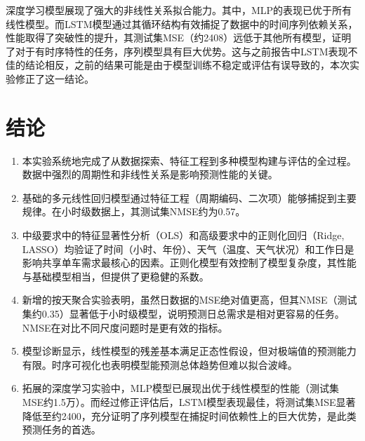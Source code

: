 \documentclass[UTF8,a4paper,10pt]{ctexart}
\begin{document}
深度学习模型展现了强大的非线性关系拟合能力。其中，MLP的表现已优于所有线性模型。而LSTM模型通过其循环结构有效捕捉了数据中的时间序列依赖关系，性能取得了突破性的提升，其测试集MSE（约2408）远低于其他所有模型，证明了对于有时序特性的任务，序列模型具有巨大优势。这与之前报告中LSTM表现不佳的结论相反，之前的结果可能是由于模型训练不稳定或评估有误导致的，本次实验修正了这一结论。

\section{结论}
\begin{enumerate}[label=\arabic{enumi}.]
    \item 本实验系统地完成了从数据探索、特征工程到多种模型构建与评估的全过程。数据中强烈的周期性和非线性关系是影响预测性能的关键。
    \item 基础的多元线性回归模型通过特征工程（周期编码、二次项）能够捕捉到主要规律。在小时级数据上，其测试集NMSE约为0.57。
    \item 中级要求中的特征显著性分析（OLS）和高级要求中的正则化回归（Ridge, LASSO）均验证了时间（小时、年份）、天气（温度、天气状况）和工作日是影响共享单车需求最核心的因素。正则化模型有效控制了模型复杂度，其性能与基础模型相当，但提供了更稳健的系数。
    \item 新增的按天聚合实验表明，虽然日数据的MSE绝对值更高，但其NMSE（测试集约0.35）显著低于小时级模型，说明预测日总需求是相对更容易的任务。NMSE在对比不同尺度问题时是更有效的指标。
    \item 模型诊断显示，线性模型的残差基本满足正态性假设，但对极端值的预测能力有限。时序可视化也表明模型能预测总体趋势但难以拟合波峰。
    \item 拓展的深度学习实验中，MLP模型已展现出优于线性模型的性能（测试集MSE约1.5万）。而经过修正评估后，LSTM模型表现最佳，将测试集MSE显著降低至约2400，充分证明了序列模型在捕捉时间依赖性上的巨大优势，是此类预测任务的首选。
\end{enumerate}
\end{document}
